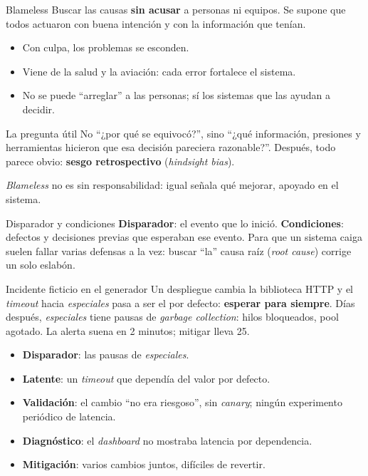 \documentclass[institutional,screen,none]{ua-engineering-v6-beamer}
\begin{document}
\begin{frame}{Blameless}
Buscar las causas \textbf{sin acusar} a personas ni equipos. Se supone que todos actuaron con buena intención y con la información que tenían.

\pause

\begin{itemize}\small
\item Con culpa, los problemas se esconden.
\item Viene de la salud y la aviación: cada error fortalece el sistema.
\item No se puede ``arreglar'' a las personas; sí los sistemas que las ayudan a decidir.
\end{itemize}

\pause

\begin{block}{La pregunta útil}
No ``¿por qué se equivocó?'', sino ``¿qué información, presiones y herramientas hicieron que esa decisión pareciera razonable?''. Después, todo parece obvio: \textbf{sesgo retrospectivo} (\emph{hindsight bias}).
\end{block}

{\small \emph{Blameless} no es sin responsabilidad: igual señala qué mejorar, apoyado en el sistema.}
\end{frame}

\begin{frame}{Disparador y condiciones}
\textbf{Disparador}: el evento que lo inició. \textbf{Condiciones}: defectos y decisiones previas que esperaban ese evento. Para que un sistema caiga suelen fallar varias defensas a la vez: buscar ``la'' causa raíz (\emph{root cause}) corrige un solo eslabón.

\pause

\begin{block}{Incidente ficticio en el generador}
\small
Un despliegue cambia la biblioteca HTTP y el \emph{timeout} hacia \emph{especiales} pasa a ser el por defecto: \textbf{esperar para siempre}. Días después, \emph{especiales} tiene pausas de \emph{garbage collection}: hilos bloqueados, pool agotado. La alerta suena en 2 minutos; mitigar lleva 25.
\end{block}

\pause

\begin{itemize}\footnotesize
\item \textbf{Disparador}: las pausas de \emph{especiales}.
\item \textbf{Latente}: un \emph{timeout} que dependía del valor por defecto.
\item \textbf{Validación}: el cambio ``no era riesgoso'', sin \emph{canary}; ningún experimento periódico de latencia.
\item \textbf{Diagnóstico}: el \emph{dashboard} no mostraba latencia por dependencia.
\item \textbf{Mitigación}: varios cambios juntos, difíciles de revertir.
\end{itemize}
\end{frame}
\end{document}
